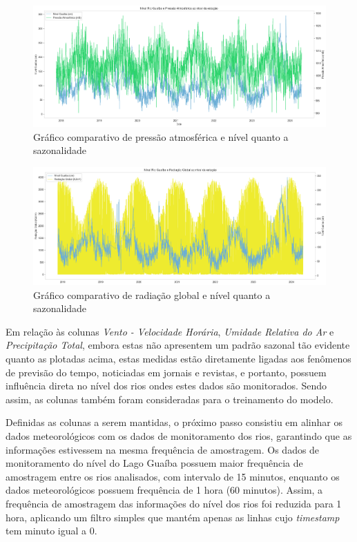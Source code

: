 \begin{figure}[H]
	\caption{\label{fig:comparacao_pressao_nivel_rio}Gráfico comparativo de pressão atmosférica e nível quanto a sazonalidade}
	\begin{center}
		\includegraphics[scale=0.35]{figuras/comparacao_pressao_nivel_rio.png}
	\end{center}
\end{figure}

\begin{figure}[H]
	\caption{\label{fig:comparacao_radiacao_nivel_rio}Gráfico comparativo de radiação global e nível quanto a sazonalidade}
	\begin{center}
		\includegraphics[scale=0.35]{figuras/comparacao_radiacao_nivel_rio.png}
	\end{center}
\end{figure}

Em relação às colunas \textit{Vento - Velocidade Horária}, \textit{Umidade Relativa do Ar} e \textit{Precipitação Total}, embora estas não apresentem um padrão sazonal tão evidente quanto as plotadas acima, estas medidas estão diretamente ligadas aos fenômenos de previsão do tempo, noticiadas em jornais e revistas, e portanto, possuem influência direta no nível dos rios ondes estes dados são monitorados. Sendo assim, as colunas também foram consideradas para o treinamento do modelo.

Definidas as colunas a serem mantidas, o próximo passo consistiu em alinhar os dados meteorológicos com os dados de monitoramento dos rios, garantindo que as informações estivessem na mesma frequência de amostragem. Os dados de monitoramento do nível do Lago Guaíba possuem maior frequência de amostragem entre os rios analisados, com intervalo de 15 minutos, enquanto os dados meteorológicos possuem frequência de 1 hora (60 minutos). Assim, a frequência de amostragem das informações do nível dos rios foi reduzida para 1 hora, aplicando um filtro simples que mantém apenas as linhas cujo \textit{timestamp} tem minuto igual a 0.

